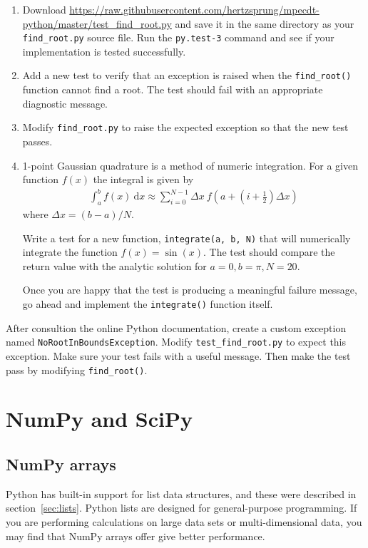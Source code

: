 \documentclass[a4paper,twoside,titlepage]{memoir}
\makeatletter
\newcommand{\FrameTitle}[2]{%
  \fboxrule=\FrameRule \fboxsep=\FrameSep
  \fbox{\vbox{\nobreak \vskip -0.7\FrameSep
    \rlap{\centerline{\strut#1}}\nobreak\nointerlineskip%
    \vskip 0.7\FrameSep
    \hbox{#2}}}}
\newenvironment{framewithtitle}[2][\FrameFirst@Lab\ (cont.)]{%
  \def\FrameFirst@Lab{\textbf{#2}}%
  \def\FrameCont@Lab{\textbf{#1}}%
  \def\FrameCommand##1{%
    \FrameTitle{\FrameFirst@Lab}{##1}}%
  \def\FirstFrameCommand##1{%
    \FrameTitle{\FrameFirst@Lab}{##1}}%
  \def\MidFrameCommand##1{%
    \FrameTitle{\FrameCont@Lab}{##1}}%
  \def\LastFrameCommand##1{%
    \FrameTitle{\FrameCont@Lab}{##1}}%
\MakeFramed{\advance\hsize-\width \FrameRestore}}%
{\endMakeFramed}
\newcounter{exercisectr}
\newenvironment{exercise}
{\stepcounter{exercisectr}\begin{framewithtitle}{Practical \arabic{exercisectr}}}
{\end{framewithtitle}}
\newcommand{\shellcmd}{\texttt}
\newcommand{\additional}{\medskip\noindent{\textit{Additional exercises}}}
\makeatother
\begin{document}
\begin{exercise}
\begin{enumerate}
\item Download \url{https://raw.githubusercontent.com/hertzsprung/mpecdt-python/master/test_find_root.py} and save it in the same directory as your \shellcmd{find\_root.py} source file.  Run the \shellcmd{py.test-3} command and see if your implementation is tested successfully.
\item Add a new test to verify that an exception is raised when the \shellcmd{find\_root()} function cannot find a root.  The test should fail with an appropriate diagnostic message.
\item Modify \shellcmd{find\_root.py} to raise the expected exception so that the new test passes.
\item 1-point Gaussian quadrature is a method of numeric integration.  For a given function $f(x)$ the integral is given by
\begin{align*}
\int_a^b f(x)\:\mathrm{d}x \approx \sum_{i=0}^{N-1} \Delta x\:f \left(a + \left(i + \frac{1}{2} \right) \Delta x \right)
\end{align*}
where $\Delta x = \left( b - a \right) / N$.

Write a test for a new function, \shellcmd{integrate(a, b, N)} that will numerically integrate the function $f(x) = \sin(x)$.  The test should compare the return value with the analytic solution for $a=0, b = \pi, N=20$.

Once you are happy that the test is producing a meaningful failure message, go ahead and implement the \shellcmd{integrate()} function itself.
\end{enumerate}

\additional

After consultion the online Python documentation, create a custom exception named \shellcmd{NoRootInBoundsException}.  Modify \shellcmd{test\_find\_root.py} to expect this exception.  Make sure your test fails with a useful message.  Then make the test pass by modifying \shellcmd{find\_root()}.
\end{exercise}

\chapter{NumPy and SciPy}

\section{NumPy arrays}
Python has built-in support for list data structures, and these were described in section~\ref{sec:lists}.  Python lists are designed for general-purpose programming.
If you are performing calculations on large data sets or multi-dimensional data, you may find that NumPy arrays offer give better performance.
\end{document}
